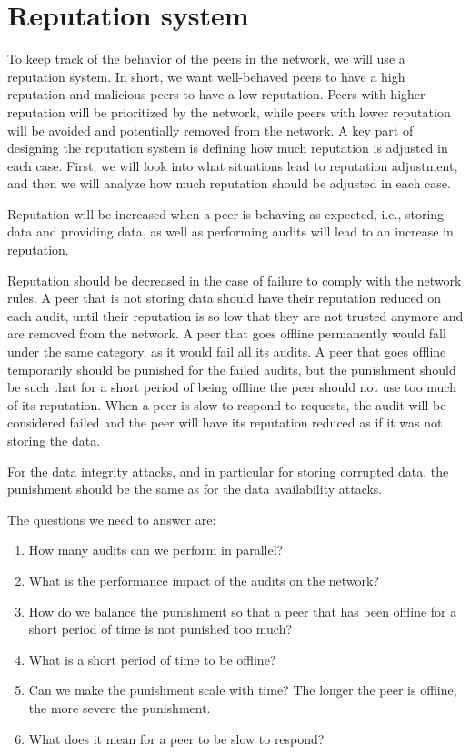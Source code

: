 \section{Reputation system}

To keep track of the behavior of the peers in the network, we will use a reputation system.
In short, we want well-behaved peers to have a high reputation and malicious peers to have a low reputation.
Peers with higher reputation will be prioritized by the network, while peers with lower reputation will be
avoided and potentially removed from the network.
A key part of designing the reputation system is defining how much reputation is adjusted in each case.
First, we will look into what situations lead to reputation adjustment, and then we will
analyze how much reputation should be adjusted in each case.

Reputation will be increased when a peer is behaving as expected,
i.e., storing data and providing data, as well as performing audits will lead to an increase in reputation.

Reputation should be decreased in the case of failure to comply with the network rules.
A peer that is not storing data should have their reputation reduced on each audit,
until their reputation is so low that they are not trusted anymore and are removed from the network.
A peer that goes offline permanently would fall under the same category, as it would fail all its audits.
A peer that goes offline temporarily should be punished for the failed audits,
but the punishment should be such that for a short period of being offline the peer should not use 
too much of its reputation.
When a peer is slow to respond to requests, the audit will be considered failed and the peer will have
its reputation reduced as if it was not storing the data.

For the data integrity attacks, and in particular for storing corrupted data,
the punishment should be the same as for the data availability attacks.

The questions we need to answer are:
\begin{enumerate}
    \item How many audits can we perform in parallel?
    \item What is the performance impact of the audits on the network?
    \item How do we balance the punishment so that a peer that has been offline for a short period of time
        is not punished too much?
    \item What is a short period of time to be offline?
    \item Can we make the punishment scale with time? The longer the peer is offline, the more severe the punishment.
    \item What does it mean for a peer to be slow to respond?
\end{enumerate}

